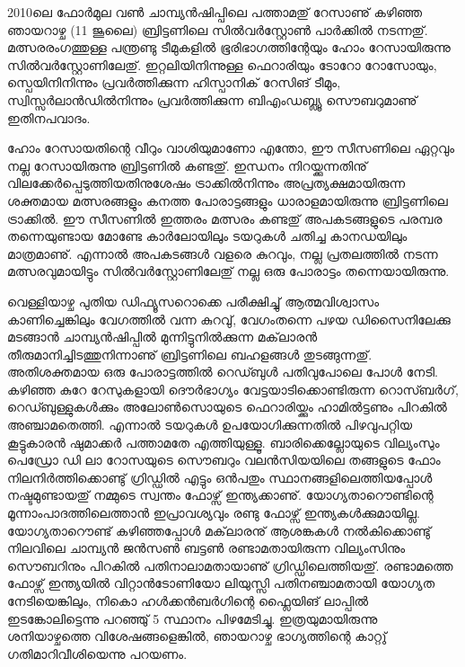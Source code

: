 ﻿
\vskip 2pt

2010ലെ ഫോര്‍മുല വണ്‍ ചാമ്പ്യന്‍ഷിപ്പിലെ പത്താമതു് റേസാണു് കഴിഞ്ഞ ഞായറാഴ്ച (11 ജൂലൈ) ബ്രിട്ടണിലെ സില്‍വര്‍സ്റ്റോണ്‍ പാര്‍ക്കില്‍ 
നടന്നതു്. മത്സരരംഗത്തുള്ള പന്ത്രണ്ടു ടീമുകളില്‍ ഭൂരിഭാഗത്തിന്റേയും ഹോം റേസായിരുന്നു സില്‍വര്‍സ്റ്റോണിലേതു്. ഇറ്റലിയിനിന്നുള്ള ഫെറാരിയും ടോറോ റോസോയും, സ്പെയിനിനിന്നും പ്രവര്‍ത്തിക്കുന്ന ഹിസ്പാനിക് റേസിങ് ടീമും, സ്വിസ്സര്‍ലാന്‍ഡില്‍നിന്നും പ്രവര്‍ത്തിക്കുന്ന ബിഎംഡബ്ല്യൂ സൌബറുമാണു് ഇതിനപവാദം.

ഹോം റേസായതിന്റെ വീറും വാശിയുമാണോ എന്തോ, ഈ സീസണിലെ ഏറ്റവും നല്ല റേസായിരുന്നു ബ്രിട്ടണില്‍ കണ്ടതു്.   
ഇന്ധനം നിറയ്ക്കുന്നതിനു് വിലക്കേര്‍പ്പെടുത്തിയതിനുശേഷം ട്രാക്കില്‍നിന്നും അപ്രത്യക്ഷമായിരുന്ന ശക്തമായ മത്സരങ്ങളും കനത്ത
 പോരാട്ടങ്ങളും ധാരാളമായിരുന്നു ബ്രിട്ടണിലെ ട്രാക്കില്‍. ഈ സീസണില്‍ ഇത്തരം മത്സരം കണ്ടതു് അപകടങ്ങളുടെ പരമ്പര 
 തന്നെയുണ്ടായ മോണ്ടേ കാര്‍ലോയിലും ടയറുകള്‍ ചതിച്ച കാനഡയിലും മാത്രമാണു്. എന്നാല്‍ അപകടങ്ങള്‍ വളരെ കുറവും, 
 നല്ല പ്രതലത്തില്‍ നടന്ന മത്സരവുമായിട്ടും സില്‍വര്‍സ്റ്റോണിലേതു് നല്ല ഒരു പോരാട്ടം തന്നെയായിരുന്നു.

വെള്ളിയാഴ്ച പുതിയ ഡിഫ്യൂസറൊക്കെ പരീക്ഷിച്ചു് ആത്മവിശ്വാസം കാണിച്ചെങ്കിലും വേഗത്തില്‍ വന്ന കുറവു്, വേഗംതന്നെ പഴയ 
ഡിസൈനിലേക്കു മടങ്ങാന്‍ ചാമ്പ്യന്‍ഷിപ്പില്‍ മുന്നിട്ടുനില്‍ക്കുന്ന മക്‌ലാരന്‍ തീരുമാനിച്ചിടത്തുനിന്നാണു് ബ്രിട്ടണിലെ ബഹളങ്ങള്‍ 
തുടങ്ങുന്നതു്. അതിശക്തമായ ഒരു പോരാട്ടത്തില്‍ റെഡ്ബുള്‍ പതിവുപോലെ പോള്‍ നേടി. കഴിഞ്ഞ കുറേ റേസുകളായി ദൌര്‍ഭാഗ്യം 
വേട്ടയാടിക്കൊണ്ടിരുന്ന റൊസ്ബര്‍ഗ്, റെഡ്ബുള്ളുകള്‍ക്കും അലോണ്‍സൊയുടെ ഫെറാരിയ്ക്കും ഹാമില്‍ട്ടണും പിറകില്‍ അഞ്ചാമതെത്തി. 
എന്നാല്‍ ടയറുകള്‍ ഉപയോഗിക്കുന്നതില്‍ പിഴവുപറ്റിയ കൂട്ടുകാരന്‍ ഷുമാക്കര്‍ പത്താമതേ എത്തിയുള്ളൂ. ബാരിക്കെല്ലോയുടെ വില്യംസും 
പെഡ്രോ ഡി ലാ റോസയുടെ സൌബറും വലന്‍സിയയിലെ തങ്ങളുടെ ഫോം നിലനിര്‍ത്തിക്കൊണ്ടു് ഗ്രിഡ്ഡില്‍ എട്ടും ഒന്‍പതും 
സ്ഥാനങ്ങളിലെത്തിയപ്പോള്‍ നഷ്ടമുണ്ടായതു് നമ്മുടെ സ്വന്തം ഫോഴ്സ് ഇന്ത്യക്കാണു്. യോഗ്യതാറൌണ്ടിന്റെ മൂന്നാംപാദത്തിലെത്താന്‍ 
ഇപ്രാവശ്യവും രണ്ടു ഫോഴ്സ് ഇന്ത്യകള്‍ക്കുമായില്ല. യോഗ്യതാറൌണ്ട് കഴിഞ്ഞപ്പോള്‍ മക്‌ലാരനു് ആശങ്കകള്‍ നല്‍കിക്കൊണ്ടു് നിലവിലെ 
ചാമ്പ്യന്‍ ജന്‍സണ്‍ ബട്ടണ്‍ രണ്ടാമതായിരുന്ന വില്യംസിനും സൌബറിനും പിറകില്‍ പതിനാലാമതായാണു് ഗ്രിഡ്ഡിലെത്തിയതു്. രണ്ടാമത്തെ 
ഫോഴ്സ് ഇന്ത്യയില്‍ വിറ്റാന്‍ടോണിയോ ലിയുസ്സി പതിനഞ്ചാമതായി യോഗ്യത നേടിയെങ്കിലും, നികൊ ഹള്‍ക്കന്‍ബര്‍ഗിന്റെ ഫ്ലൈയിങ് 
ലാപ്പില്‍ ഇടങ്കോലിട്ടെന്നു പറഞ്ഞു്  5 സ്ഥാനം പിഴമേടിച്ചു. ഇത്രയുമായിരുന്നു ശനിയാഴ്ചത്തെ വിശേഷങ്ങളെങ്കില്‍, ഞായറാഴ്ച ഭാഗ്യത്തിന്റെ 
കാറ്റു് ഗതിമാറിവീശിയെന്നു പറയണം.

